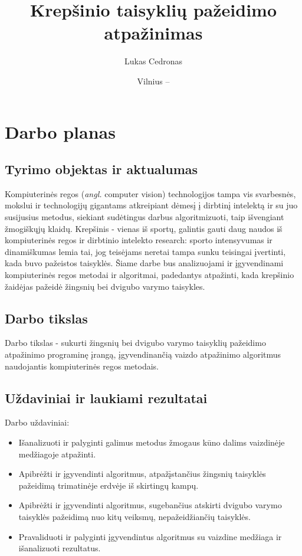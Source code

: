 \documentclass{VUMIFPSbakalaurinis}
\institute{Informatikos institutas}  %
\title{Krepšinio taisyklių pažeidimo atpažinimas}
\author{Lukas Cedronas}
\date{Vilnius – \the\year}
\begin{document}
\maketitle


\section{Darbo planas}

\subsection{Tyrimo objektas ir aktualumas}
Kompiuterinės regos (\textit{angl.} computer vision) technologijos tampa vis svarbesnės, mokslui ir technologijų gigantams atkreipiant dėmesį į dirbtinį intelektą ir su juo susijusius metodus, siekiant sudėtingus darbus algoritmizuoti, taip išvengiant žmogiškųjų klaidų. Krepšinis - vienas iš sportų, galintis gauti daug naudos iš kompiuterinės regos ir dirbtinio intelekto research: sporto intensyvumas ir dinamiškumas lemia tai, jog teisėjams neretai tampa sunku teisingai įvertinti, kada buvo pažeistos taisyklės. Šiame darbe bus analizuojami ir įgyvendinami kompiuterinės regos metodai ir algoritmai, padedantys atpažinti, kada krepšinio žaidėjas pažeidė žingsnių bei dvigubo varymo taisykles. 

\subsection{Darbo tikslas}
Darbo tikslas - sukurti žingsnių bei dvigubo varymo taisyklių pažeidimo atpažinimo programinę įrangą, įgyvendinančią vaizdo atpažinimo algoritmus naudojantis kompiuterinės regos metodais.

\subsection{Uždaviniai ir laukiami rezultatai}
Darbo uždaviniai:
\begin{itemize}[topsep=5pt,itemsep=-1ex,partopsep=2ex,parsep=2ex]
 \item Išanalizuoti ir palyginti galimus metodus žmogaus kūno dalims vaizdinėje medžiagoje atpažinti.
 \item Apibrėžti ir įgyvendinti algoritmus, atpažįstančius žingsnių taisyklės pažeidimą trimatinėje erdvėje iš skirtingų kampų.
 \item Apibrėžti ir įgyvendinti algoritmus, sugebančius atskirti dvigubo varymo taisyklės pažeidimą nuo kitų veiksmų, nepažeidžiančių taisyklės.
 \item Pravaliduoti ir palyginti įgyvendintus algoritmus su vaizdine medžiaga ir išanalizuoti rezultatus.
\end{itemize}
\end{document}
